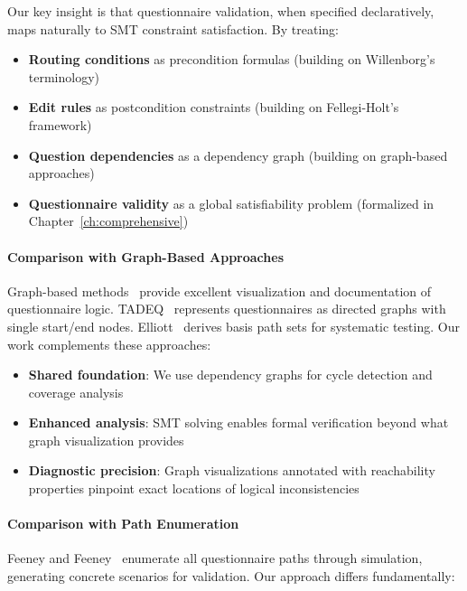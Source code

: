 Our key insight is that questionnaire validation, when specified declaratively, maps naturally to SMT constraint satisfaction. By treating:

\begin{itemize}
    \item \textbf{Routing conditions} as precondition formulas (building on Willenborg's terminology)
    \item \textbf{Edit rules} as postcondition constraints (building on Fellegi-Holt's framework)
    \item \textbf{Question dependencies} as a dependency graph (building on graph-based approaches)
    \item \textbf{Questionnaire validity} as a global satisfiability problem (formalized in Chapter~\ref{ch:comprehensive})
\end{itemize}

\paragraph{Comparison with Graph-Based Approaches}

Graph-based methods~\cite{bethlehem2004tadeq, elliott2012application, schiopu2015survey} provide excellent visualization and documentation of questionnaire logic. TADEQ~\cite{bethlehem2004tadeq} represents questionnaires as directed graphs with single start/end nodes. Elliott~\cite{elliott2012application} derives basis path sets for systematic testing. Our work complements these approaches:

\begin{itemize}
    \item \textbf{Shared foundation}: We use dependency graphs for cycle detection and coverage analysis
    \item \textbf{Enhanced analysis}: SMT solving enables formal verification beyond what graph visualization provides
    \item \textbf{Diagnostic precision}: Graph visualizations annotated with reachability properties pinpoint exact locations of logical inconsistencies
\end{itemize}

\paragraph{Comparison with Path Enumeration}

Feeney and Feeney~\cite{feeney2019logical} enumerate all questionnaire paths through simulation, generating concrete scenarios for validation. Our approach differs fundamentally:

